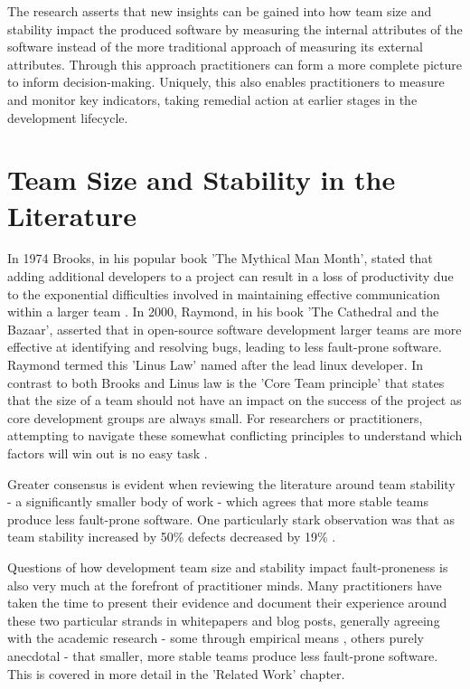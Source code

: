 The research asserts that new insights can be gained into how team size and stability impact the produced software by measuring the internal attributes of the software instead of the more traditional approach of measuring its external attributes. Through this approach practitioners can form a more complete picture to inform decision-making. Uniquely, this also enables practitioners to measure and monitor key indicators, taking remedial action at earlier stages in the development lifecycle.

\section{Team Size and Stability in the Literature} %
In 1974 Brooks, in his popular book 'The Mythical Man Month', stated that adding additional developers to a project can result in a loss of productivity due to the exponential difficulties involved in maintaining effective communication within a larger team \citep{brooks1986mythical}. In 2000, Raymond, in his book 'The Cathedral and the Bazaar', asserted that in open-source software development larger teams are more effective at identifying and resolving bugs, leading to less fault-prone software. Raymond termed this 'Linus Law' named after the lead linux developer. In contrast to both Brooks and Linus law is the 'Core Team principle' that states that the size of a team should not have an impact on the success of the project as core development groups are always small. For researchers or practitioners, attempting to navigate these somewhat conflicting principles to understand which factors will win out is no easy task \citep{schweik2008brooks}. 

Greater consensus is evident when reviewing the literature around team stability - a significantly smaller body of work - which agrees that more stable teams produce less fault-prone software. One particularly stark observation was that as team stability increased by 50\% defects decreased by 19\% \citep{huckman2009team}.

Questions of how development team size and stability impact fault-proneness is also very much at the forefront of practitioner minds. Many practitioners have taken the time to present their evidence and document their experience around these two particular strands in whitepapers and blog posts, generally agreeing with the academic research - some through empirical means \citep{macheronne2013critical, mcconnell2017less}, others purely anecdotal \citep{miller2006critical, erickson2012are, meccia2015critical, plowman2015seven} - that smaller, more stable teams produce less fault-prone software. This is covered in more detail in the 'Related Work' chapter.

